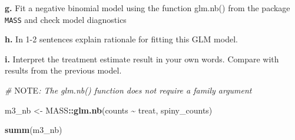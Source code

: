 \documentclass[
]{article}
\newenvironment{Shaded}{\begin{snugshade}}{\end{snugshade}}
\newcommand{\AlertTok}[1]{\textcolor[rgb]{0.94,0.16,0.16}{#1}}
\newcommand{\CommentTok}[1]{\textcolor[rgb]{0.56,0.35,0.01}{\textit{#1}}}
\newcommand{\FunctionTok}[1]{\textcolor[rgb]{0.13,0.29,0.53}{\textbf{#1}}}
\newcommand{\NormalTok}[1]{#1}
\newcommand{\OtherTok}[1]{\textcolor[rgb]{0.56,0.35,0.01}{#1}}
\newcommand{\SpecialCharTok}[1]{\textcolor[rgb]{0.81,0.36,0.00}{\textbf{#1}}}
\begin{document}
\textbf{g.} Fit a negative binomial model using the function glm.nb()
from the package \texttt{MASS} and check model diagnostics

\textbf{h.} In 1-2 sentences explain rationale for fitting this GLM
model.

\textbf{i.} Interpret the treatment estimate result in your own words.
Compare with results from the previous model.

\begin{Shaded}
\begin{Highlighting}[]
\CommentTok{\# }\AlertTok{NOTE}\CommentTok{: The \textasciigrave{}glm.nb()\textasciigrave{} function does not require a \textasciigrave{}family\textasciigrave{} argument}

\NormalTok{m3\_nb }\OtherTok{\textless{}{-}}\NormalTok{ MASS}\SpecialCharTok{::}\FunctionTok{glm.nb}\NormalTok{(counts }\SpecialCharTok{\textasciitilde{}}\NormalTok{ treat,}
\NormalTok{               spiny\_counts)}

\FunctionTok{summ}\NormalTok{(m3\_nb)}
\end{Highlighting}
\end{Shaded}
\end{document}
